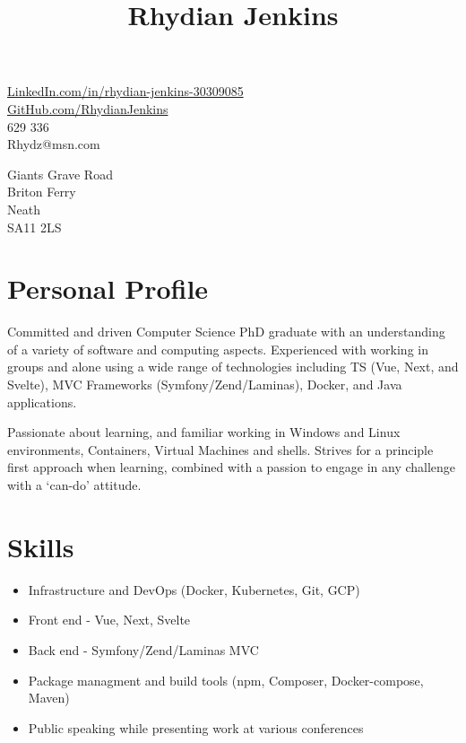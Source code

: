 \documentclass[10pt]{article}
\title{\bfseries\Huge Rhydian Jenkins}
\date{}
\author{}
\begin{document}
\maketitle \vspace{-7em}

\section*{}
\begin{minipage}{0.5\textwidth}
	\faLinkedin \quad \href{https://www.linkedin.com/in/rhydian-jenkins-30309085/}{LinkedIn.com/in/rhydian-jenkins-30309085}\\
	\faGithub \quad \href{https://github.com/RhydianJenkins}{GitHub.com/RhydianJenkins}\\
	\faPhone {} 629 336\\
	\faEnvelope \quad Rhydz@msn.com
\end{minipage}
\begin{minipage}{0.5\textwidth}
    \begin{flushright}
	Giants Grave Road\\
	Briton Ferry\\
	Neath\\
    SA11 2LS
    \end{flushright}
\end{minipage}

\section*{Personal Profile}
\noindent Committed and driven Computer Science PhD graduate with an understanding of a variety of software and computing aspects. Experienced with working in groups and alone using a wide range of technologies including TS (Vue, Next, and Svelte), MVC Frameworks (Symfony/Zend/Laminas), Docker, and Java applications.

\noindent Passionate about learning, and familiar working in Windows and Linux environments, Containers, Virtual Machines and shells. Strives for a principle first approach when learning, combined with a passion to engage in any challenge with a `can-do' attitude.

\section*{Skills}
\begin{itemize} \setlength\itemsep{-0.25em}
	\item Infrastructure and DevOps (Docker, Kubernetes, Git, GCP)
	\item Front end - Vue, Next, Svelte
	\item Back end - Symfony/Zend/Laminas MVC
	\item Package managment and build tools (npm, Composer, Docker-compose, Maven)
	\item Public speaking while presenting work at various conferences
\end{itemize}
\end{document}
